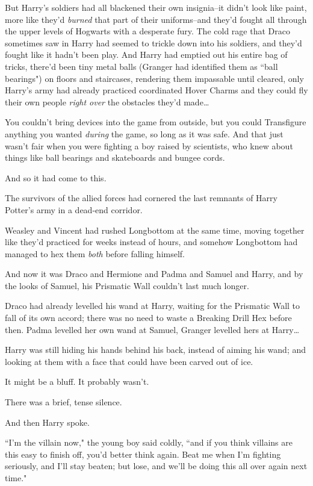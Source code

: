But Harry's soldiers had all blackened their own insignia\---it didn't look like paint, more like they'd \emph{burned} that part of their uniforms\---and they'd fought all through the upper levels of Hogwarts with a desperate fury. The cold rage that Draco sometimes saw in Harry had seemed to trickle down into his soldiers, and they'd fought like it hadn't been play. And Harry had emptied out his entire bag of tricks, there'd been tiny metal balls (Granger had identified them as ``ball bearings") on floors and staircases, rendering them impassable until cleared, only Harry's army had already practiced coordinated Hover Charms and they could fly their own people \emph{right over} the obstacles they'd made{\ldots}

You couldn't bring devices into the game from outside, but you could Transfigure anything you wanted \emph{during} the game, so long as it was safe. And that just wasn't fair when you were fighting a boy raised by scientists, who knew about things like ball bearings and skateboards and bungee cords.

And so it had come to this.

The survivors of the allied forces had cornered the last remnants of Harry Potter's army in a dead-end corridor.

Weasley and Vincent had rushed Longbottom at the same time, moving together like they'd practiced for weeks instead of hours, and somehow Longbottom had managed to hex them \emph{both} before falling himself.

And now it was Draco and Hermione and Padma and Samuel and Harry, and by the looks of Samuel, his Prismatic Wall couldn't last much longer.

Draco had already levelled his wand at Harry, waiting for the Prismatic Wall to fall of its own accord; there was no need to waste a Breaking Drill Hex before then. Padma levelled her own wand at Samuel, Granger levelled hers at Harry{\ldots}

Harry was still hiding his hands behind his back, instead of aiming his wand; and looking at them with a face that could have been carved out of ice.

It might be a bluff. It probably wasn't.

There was a brief, tense silence.

And then Harry spoke.

``I'm the villain now," the young boy said coldly, ``and if you think villains are this easy to finish off, you'd better think again. Beat me when I'm fighting seriously, and I'll stay beaten; but lose, and we'll be doing this all over again next time."

